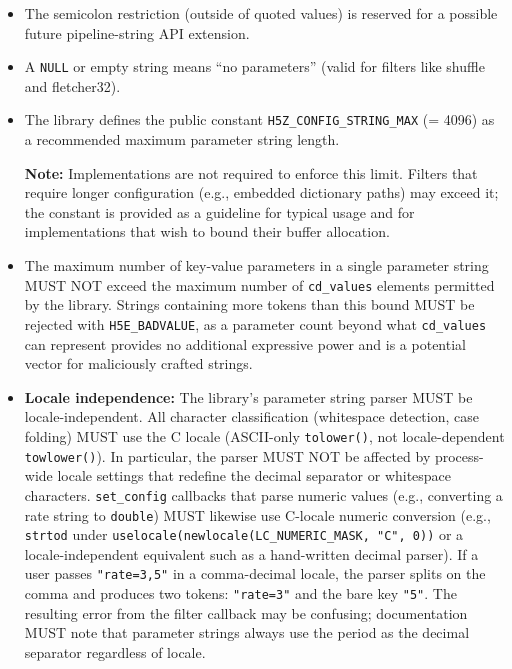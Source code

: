 \documentclass[../HDF5_RFC.tex]{subfiles}
\begin{document}
\begin{itemize}
\item The semicolon restriction (outside of quoted values) is reserved for a
  possible future pipeline-string API extension.
\item A \texttt{NULL} or empty string means ``no parameters'' (valid for filters like
  shuffle and fletcher32).
\item The library defines the public constant \texttt{H5Z\_CONFIG\_STRING\_MAX}
  (= 4096) as a recommended maximum parameter string length.

\noindent\colorbox{yellow!25}{\parbox{\dimexpr\linewidth-2\fboxsep}{%
  \textbf{Note:} Implementations are not required to enforce this limit.
  Filters that require longer configuration (e.g., embedded dictionary paths)
  may exceed it; the constant is provided as a guideline for typical usage
  and for implementations that wish to bound their buffer allocation.
}}
\item The maximum number of key-value parameters in a single parameter string
  MUST NOT exceed the maximum number of \texttt{cd\_values} elements permitted
  by the library.  Strings containing more tokens than this bound MUST be
  rejected with \texttt{H5E\_BADVALUE}, as a parameter count beyond what
  \texttt{cd\_values} can represent provides no additional expressive power
  and is a potential vector for maliciously crafted strings.
\item \textbf{Locale independence:} The library's parameter string parser MUST
  be locale-independent. All character classification (whitespace detection,
  case folding) MUST use the C locale (ASCII-only \texttt{tolower()}, not
  locale-dependent \texttt{towlower()}). In particular, the parser MUST NOT be
  affected by process-wide locale settings that redefine the decimal separator
  or whitespace characters. \texttt{set\_config} callbacks that parse numeric
  values (e.g., converting a rate string to \texttt{double}) MUST likewise use
  C-locale numeric conversion (e.g., \texttt{strtod} under
  \texttt{uselocale(newlocale(LC\_NUMERIC\_MASK, "C", 0))} or a
  locale-independent equivalent such as a hand-written decimal parser). If a
  user passes \texttt{"rate=3,5"} in a comma-decimal locale, the parser splits
  on the comma and produces two tokens: \texttt{"rate=3"} and the bare key
  \texttt{"5"}. The resulting error from the filter callback may be confusing;
  documentation MUST note that parameter strings always use the period as the
  decimal separator regardless of locale.
\end{itemize}
\end{document}
